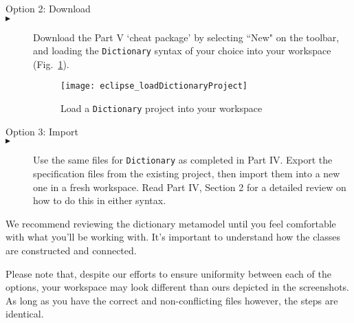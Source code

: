 \begin{description}
\newpage %


\item[Option 2: Download] 


\item[$\blacktriangleright$] \hspace{0.3cm} Download the Part V `cheat package' by selecting ``New" on the toolbar, and loading the \texttt{Dictionary} syntax
of your choice into your workspace (Fig.~\ref{eclipse_cheatPackage}).

\vspace{0.5cm}

\begin{figure}[htbp]
\begin{center}
  \texttt{[image: eclipse\_loadDictionaryProject]}
  \caption{Load a \texttt{Dictionary} project into your workspace}
  \label{eclipse_cheatPackage}
\end{center}
\end{figure}

\vspace{0.5cm}


\item[Option 3: Import]


\item[$\blacktriangleright$] \hspace{0.3cm} Use the same files for \texttt{Dictionary} as completed in Part IV. Export the specification files from the existing
project, then import them into a new one in a fresh workspace. Read Part IV, Section 2 for a detailed review on how to do this in either syntax.

\end{description}

We recommend reviewing the dictionary metamodel until you feel comfortable with what you'll be working with. It's important to understand how the classes are
constructed and connected. 

Please note that, despite our efforts to ensure uniformity between each of the options, your workspace may look different than ours
depicted in the screenshots. As long as you have the correct and non-conflicting files however, the steps are identical.


\newpage

